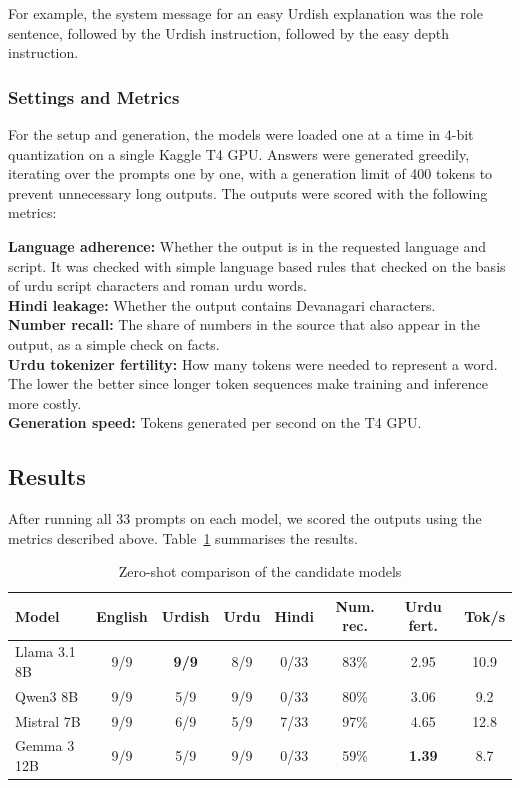 \documentclass{FastFyp}
\begin{document}
For example, the system message for an easy Urdish explanation was the role sentence, followed by the Urdish instruction, followed by the easy depth instruction.

\subsubsection{Settings and Metrics}
For the setup and generation, the models were loaded one at a time in 4-bit quantization on a single Kaggle T4 GPU. Answers were generated greedily, iterating over the prompts one by one, with a generation limit of 400 tokens to prevent unnecessary long outputs. The outputs were scored with the following metrics:

 \textbf{Language adherence:} Whether the output is in the requested language and script. It was checked with simple language based rules that checked on the basis of urdu script characters and roman urdu words.\\
 \textbf{Hindi leakage:} Whether the output contains Devanagari characters.\\
 \textbf{Number recall:} The share of numbers in the source that also appear in the output, as a simple check on facts.\\
 \textbf{Urdu tokenizer fertility:} How many tokens were needed to represent a word. The lower the better since longer token sequences make training and inference more costly.\\
 \textbf{Generation speed:} Tokens generated per second on the T4 GPU.\\

\subsection{Results}
After running all 33 prompts on each model, we scored the outputs using the metrics described above. Table~\ref{tab:base-results} summarises the results.

\begin{table}[!ht]
\centering
\caption{Zero-shot comparison of the candidate models}
\label{tab:base-results}
\footnotesize
\setlength{\tabcolsep}{3pt}
\begin{tabular}{|l|c|c|c|c|c|c|c|}
\hline
\textbf{Model} & \textbf{English} & \textbf{Urdish} & \textbf{Urdu} & \textbf{Hindi} & \textbf{Num. rec.} & \textbf{Urdu fert.} & \textbf{Tok/s} \\ \hline
Llama 3.1 8B & 9/9 & \textbf{9/9} & 8/9 & 0/33 & 83\% & 2.95 & 10.9 \\ \hline
Qwen3 8B     & 9/9 & 5/9 & 9/9 & 0/33 & 80\% & 3.06 & 9.2 \\ \hline
Mistral 7B   & 9/9 & 6/9 & 5/9 & 7/33 & 97\% & 4.65 & 12.8 \\ \hline
Gemma 3 12B  & 9/9 & 5/9 & 9/9 & 0/33 & 59\% & \textbf{1.39} & 8.7 \\ \hline
\end{tabular}
\end{table}
\end{document}
